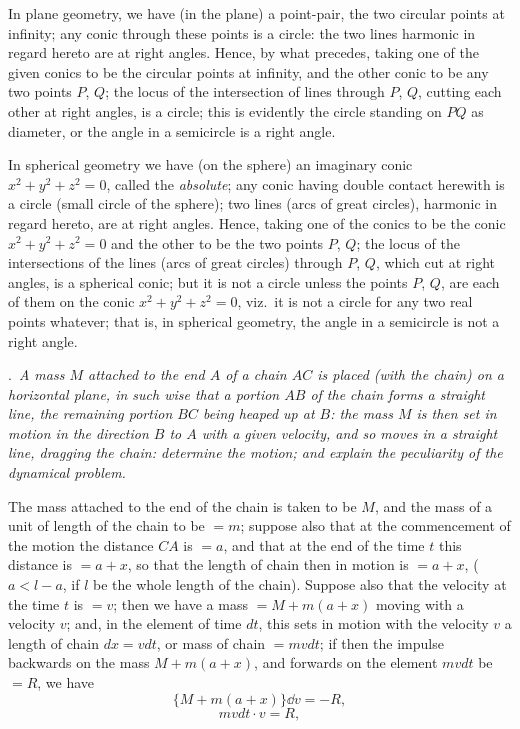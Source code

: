 \documentclass[11pt,a4paper]{book}
\begin{document}
In plane geometry, we have (in the plane) a point-pair, the two circular points
at infinity; any conic through these points is a circle: the two lines harmonic in
regard hereto are at right angles. Hence, by what precedes, taking one of the given
conics to be the circular points at infinity, and the other conic to be any two points
$P$, $Q$; the locus of the intersection of lines through $P$, $Q$, cutting each other at right
angles, is a circle; this is evidently the circle standing on $PQ$ as diameter, or the
angle in a semicircle is a right angle.

In spherical geometry we have (on the sphere) an imaginary conic $x^2 + y^2 + z^2 = 0$,
called the \textit{absolute}; any conic having double contact herewith is a circle (small circle
of the sphere); two lines (arcs of great circles), harmonic in regard hereto, are at right
angles. Hence, taking one of the conics to be the conic $x^2 + y^2 + z^2 = 0$ and the other
to be the two points $P$, $Q$; the locus of the intersections of the lines (arcs of great
circles) through $P$, $Q$, which cut at right angles, is a spherical conic; but it is not a
circle unless the points $P$, $Q$, are each of them on the conic $x^2 + y^2 + z^2 = 0$, viz.\ it is
not a circle for any two real points whatever; that is, in spherical geometry, the
angle in a semicircle is not a right angle.

\medskip
{}.\ \textit{A mass $M$ attached to the end $A$ of a chain $AC$ is placed (with the chain)
on a horizontal plane, in such wise that a portion $AB$ of the chain forms a straight
line, the remaining portion $BC$ being heaped up at $B$: the mass $M$ is then set in
motion in the direction $B$ to $A$ with a given velocity, and so moves in a straight line,
dragging the chain: determine the motion; and explain the peculiarity of the dynamical
problem.}

\medskip

The mass attached to the end of the chain is taken to be $M$, and the mass of
a unit of length of the chain to be $=m$; suppose also that at the commencement
of the motion the distance $CA$ is $=a$, and that at the end of the time $t$ this distance
is $=a+x$, so that the length of chain then in motion is $=a+x$, ($a < l - a$, if $l$ be
the whole length of the chain). Suppose also that the velocity at the time $t$ is $=v$;
then we have a mass $=M+m(a+x)$ moving with a velocity $v$; and, in the element
of time $dt$, this sets in motion with the velocity $v$ a length of chain $dx = vdt$, or mass
of chain $= mvdt$; if then the impulse backwards on the mass $M+m(a+x)$, and
forwards on the element $mvdt$ be $=R$, we have
\[
\{M+m(a+x)\}\dd v = -R,
\]
\[
mvdt \cdot v = R,
\]
\end{document}
